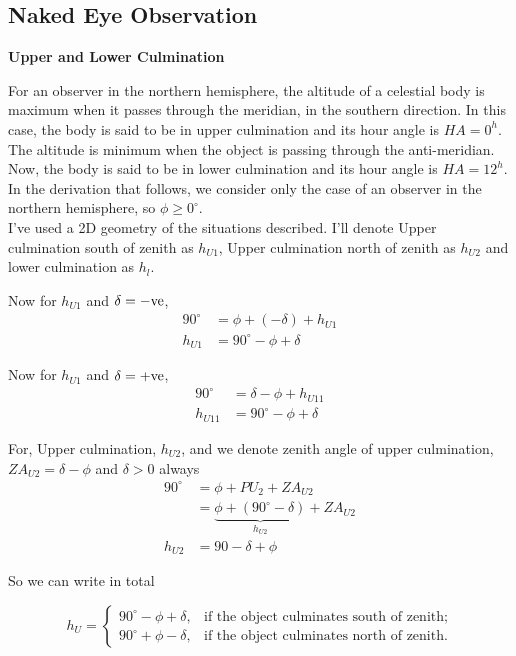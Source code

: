 \documentclass[a4paper,12pt]{extarticle}
\begin{document}
\subsection{Naked Eye Observation}

\textsf{\textbf{Upper and Lower Culmination}}

For an observer in the northern hemisphere, the altitude of a celestial body is maximum when it passes through the meridian, in the southern direction. In this case, the body is said to be in upper culmination and its hour angle is $HA= 0^h$. The altitude is minimum when the object is passing through the anti-meridian. Now, the body is said to be in lower culmination and its hour angle is $HA = 12^h$. In the derivation that follows, we consider only the case of an observer in the
northern hemisphere, so $\phi \geq 0^\circ$.\\

I've used a 2D geometry of the situations described. I'll denote Upper culmination south of zenith as $h_{U1}$, Upper culmination north of zenith as $h_{U2}$ and lower culmination as $h_l$.
\begin{multicols}{2}
	Now for $h_{U1}$ and $\delta=-\rm ve$,
	\begin{align*}
		90^\circ &=\phi+ (-\delta)+ h_{U1}\\
		h_{U1} &= 90^\circ-\phi+\delta 
	\end{align*} 
	
	Now for $h_{U1}$ and $\delta=+\rm ve$,
	\begin{align*}
		90^\circ &=\delta-\phi + h_{U11}\\
		h_{U11} &= 90^\circ-\phi+\delta 
	\end{align*} 
\end{multicols}
For, Upper culmination, $h_{U2}$, and we denote zenith angle of upper culmination, $ZA_{U2}=\delta-\phi$ and $\delta>0$ always
\begin{align*}
	90^\circ &= \phi +PU_2+ZA_{U2}\\
	&= \underbrace{\phi+ (90^\circ-\delta)}_{h_{U2}}+ZA_{U2}\\
	h_{U2} &=90-\delta +\phi
\end{align*}

So we can write in total 

\begin{defi}
	\begin{equation}
		\boxed{h_U =\begin{cases}
				90^\circ - \phi + \delta, & \text{if the object culminates south of zenith;} \\
				90^\circ + \phi - \delta, & \text{if the object culminates north of zenith.}
		\end{cases}}
	\end{equation}	
\end{defi}
\end{document}
